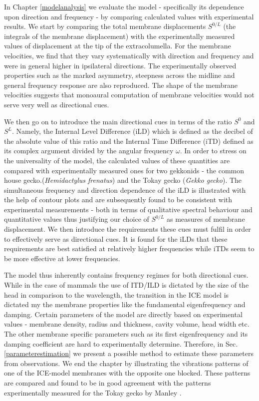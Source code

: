In Chapter \ref{modelanalysis} we evaluate the model - specifically its dependence upon direction and frequency - 
by comparing calculated values with experimental results. We start
by comparing the total membrane displacements $S^{0/L}$ (the integrals of the membrane displacement) with the experimentally 
measured values of displacement at the tip of the extracolumella. 
For the membrane velocities, we find that they vary systematically with
direction and frequency and were in general higher in ipsilateral directions. The experimentally observed properties such
as the marked asymmetry, steepness across the midline and general frequency response are also reproduced. The shape of the membrane
velocities suggests that monoaural computation of membrane velocities would not serve very well as directional cues.

We then go on to introduce the main directional cues in terms of the ratio $S^{0}$ and $S^{L}$. Namely, the Internal Level Difference
(iLD) which is defined as the decibel of the absolute value of this ratio and the Internal Time Difference (iTD) defined as its complex
argument divided by the angular frequency $\omega$. In order to stress on the universality of the model, the calculated values of these
 quantities are compared with experimentally measured ones for two gekkonids - the common house gecko.(\emph{Hemidactylus frenatus}) and the Tokay gecko
 (\emph{Gekko gecko}). The simultaneous frequency and direction dependence of the iLD is illustrated with the help
 of contour plots and are subsequently found to be consistent with experimental measurements - both in terms of qualitative spectral behaviour and
quantitative values thus justifying our choice of $S^{0/L}$ as measures of membrane displacement. We then introduce the requirements these cues must fulfil in order to effectively serve as
directional cues. It is found for the iLDs that these requirements are best satisfied at relatively higher frequencies while
 iTDs seem to be more effective at lower frequencies.
 
The model thus inherently contains frequency regimes for both directional cues. While in the case of mammals the use of ITD/ILD
is dictated by the size of the head in comparison to the wavelength, the transition in the ICE model is dictated my the membrane
properties like the fundamental eigenfrequency and damping. Certain parameters of the model are directly based on experimental
values - membrane density, radius and thickness, cavity volume, head width etc. The other membrane specific parameters such
as its first eigenfrequency and its damping coefficient are hard to experimentally determine. Therefore, in Sec. \ref{parameterestimation} we present
a possible method to estimate these parameters from observations. We end the chapter by illustrating the vibrations patterns of one of the ICE-model
membranes with the opposite one blocked. These patterns are compared and found to be in good agreement with the patterns experimentally measured for the Tokay gecko 
by Manley \cite{manleygecko1}.
